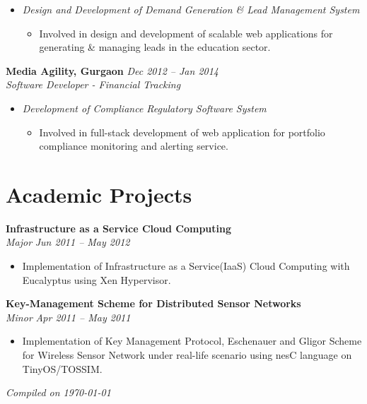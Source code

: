 \documentclass[margin,line]{resume}
\begin{document}
\begin{resume}
\begin{itemize}
     \item \textsl{Design and Development of Demand Generation \& Lead Management System}
        \begin{itemize}
            \item Involved in design and development of scalable web applications for generating \& managing leads
            in the education sector.
        \end{itemize}
   \end{itemize}

\textbf{Media Agility, Gurgaon}   \hfill \textsl{Dec 2012 -- Jan 2014} \vspace{0mm}\\\vspace{0mm}%
           \textsl{Software Developer - Financial Tracking}\\
    \begin{itemize}
    
     \item \textsl{Development of Compliance Regulatory Software System} 
        \begin{itemize}
            \item Involved in full-stack development of web application for portfolio compliance monitoring and alerting service.
        \end{itemize}
    
    \end{itemize}

    
    \section{\mysidestyle Academic Projects}
    \textbf{Infrastructure as a Service Cloud Computing}\vspace{0mm}\\\vspace{0mm}%
    \textsl{Major} \hfill \textsl{Jun 2011 -- May 2012}
       \begin{itemize} 
	        \item Implementation of Infrastructure as a Service(IaaS) Cloud Computing with Eucalyptus using Xen Hypervisor.
       \end{itemize}

    \textbf{Key-Management Scheme for Distributed Sensor Networks}\vspace{0mm}\\\vspace{0mm}%
    \textsl{Minor} \hfill \textsl{Apr 2011 -- May 2011}
       \begin{itemize} 
            \item Implementation of Key Management Protocol, Eschenauer and Gligor Scheme for Wireless Sensor Network under real-life scenario using nesC language on TinyOS/TOSSIM.
       \end{itemize}
\hfill \textsl{Compiled on \monthyeardate\today}

\end{resume}
\end{document}
